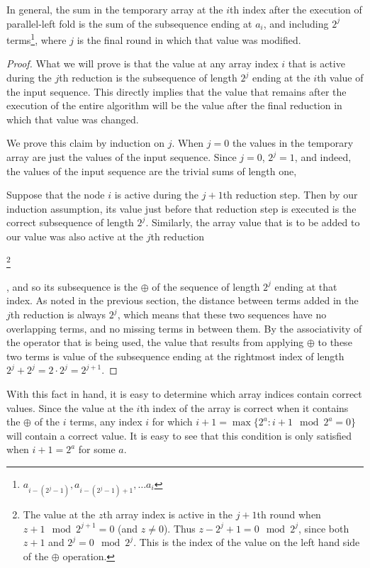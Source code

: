 \documentclass[12pt,twoside]{reedthesis}
\begin{document}
In general, the sum in the temporary array at the $i$th index after
the execution of parallel-left fold is the sum of the subsequence
ending at $a_i$, and including $2^j$ terms\footnote{$a_{i-(2^j-1)},
  a_{i-(2^j-1)+1}, \ldots a_i$}, where $j$ is the final round in which
that value was modified.

\begin{proof}
What we will prove is that the value at any array index $i$ that is active during the $j$th reduction is the subsequence of length $2^j$ ending at the $i$th value of the input sequence. This directly implies that the value that remains after the execution of the entire algorithm will be the value after the final reduction in which that value was changed.

We prove this claim by induction on $j$. When $j=0$ the values in the temporary array are just the values of the input sequence. Since $j=0$, $2^j = 1$, and indeed, the values of the input sequence are the trivial sums of length one, 

Suppose that the node $i$  is active during the $j+1$th reduction step. Then by our induction assumption, its value just before that reduction step is executed is the correct subsequence of length $2^j$. Similarly, the array value that is to be added to our value was also active at the $j$th reduction

\footnote{The value at the $z$th array index is active in the $j+1$th
  round when $z+1 \mod 2^{j+1} = 0$ (and $z \neq 0$). Thus $z - 2^j +
  1 = 0 \mod 2^j$, since both $z+1$ and $2^j = 0 \mod 2^j$. This is
  the index of the value on the left hand side of the $\oplus$
  operation.}

, and so its subsequence is the $\oplus$ of the sequence of length
$2^j$ ending at that index. As noted in the previous section, the
distance between terms added in the $j$th reduction is always $2^j$,
which means that these two sequences have no overlapping terms, and no
missing terms in between them. By the associativity of the operator
that is being used, the value that results from applying $\oplus$ to
these two terms is value of the subsequence ending at the rightmost index of length $2^j + 2^j = 2 \cdot 2^j = 2^{j+1}$.
\end{proof}

With this fact in hand, it is easy to determine which array indices
contain correct values. Since the value at the $i$th index of the
array is correct when it contains the $\oplus$ of the $i$ terms, any
index $i$ for which $i+1 = \max \{ 2^a : i+1 \mod 2^a = 0 \}$ will contain
a correct value. It is easy to see that this condition is only
satisfied when $i+1 = 2^a$ for some $a$.
\end{document}
